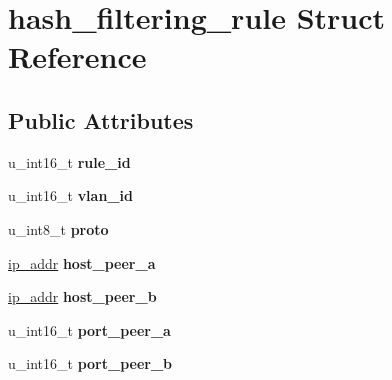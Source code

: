 \hypertarget{structhash__filtering__rule}{
\section{hash\_\-filtering\_\-rule Struct Reference}
\label{structhash__filtering__rule}
}
\subsection*{Public Attributes}
\begin{DoxyCompactItemize}
\item 
\hypertarget{structhash__filtering__rule_a777b405e01d76856a204078dbf4d9100}{
u\_\-int16\_\-t {\bfseries rule\_\-id}}
\label{structhash__filtering__rule_a777b405e01d76856a204078dbf4d9100}

\item 
\hypertarget{structhash__filtering__rule_a271e202c2d337a7a5bb5f1e11aaeee9a}{
u\_\-int16\_\-t {\bfseries vlan\_\-id}}
\label{structhash__filtering__rule_a271e202c2d337a7a5bb5f1e11aaeee9a}

\item 
\hypertarget{structhash__filtering__rule_a0412479f3f2c735a2afcb8a3e22296a4}{
u\_\-int8\_\-t {\bfseries proto}}
\label{structhash__filtering__rule_a0412479f3f2c735a2afcb8a3e22296a4}

\item 
\hypertarget{structhash__filtering__rule_a2fad42ef72fa4a10b6bacaf407b4012d}{
\hyperlink{unionip__addr}{ip\_\-addr} {\bfseries host\_\-peer\_\-a}}
\label{structhash__filtering__rule_a2fad42ef72fa4a10b6bacaf407b4012d}

\item 
\hypertarget{structhash__filtering__rule_a9b6adf25633d1194601b7a266cb5174b}{
\hyperlink{unionip__addr}{ip\_\-addr} {\bfseries host\_\-peer\_\-b}}
\label{structhash__filtering__rule_a9b6adf25633d1194601b7a266cb5174b}

\item 
\hypertarget{structhash__filtering__rule_a99ab4c25cd86637f8225f7674cf5909c}{
u\_\-int16\_\-t {\bfseries port\_\-peer\_\-a}}
\label{structhash__filtering__rule_a99ab4c25cd86637f8225f7674cf5909c}

\item 
\hypertarget{structhash__filtering__rule_a06f2d1e792391a24d6a58c91befad885}{
u\_\-int16\_\-t {\bfseries port\_\-peer\_\-b}}
\label{structhash__filtering__rule_a06f2d1e792391a24d6a58c91befad885}


\end{DoxyCompactItemize}
